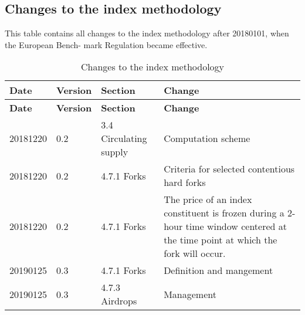 \documentclass{article}
\begin{document}
\subsection{Changes to the index
methodology}\label{changes-to-the-index-methodology}

This table contains all changes to the index methodology after 20180101,
when the European Bench- mark Regulation became effective.

\begin{longtable}[]{@{}llll@{}}
\caption{Changes to the index methodology{}}\tabularnewline
\toprule
\textbf{Date} & \textbf{Version} & \textbf{Section} &
\textbf{Change}\tabularnewline
\midrule
\endfirsthead
\toprule
\textbf{Date} & \textbf{Version} & \textbf{Section} &
\textbf{Change}\tabularnewline
\midrule
\endhead
20181220 & 0.2 & 3.4 Circulating supply & Computation
scheme\tabularnewline
20181220 & 0.2 & 4.7.1 Forks & Criteria for selected contentious hard
forks\tabularnewline
20181220 & 0.2 & 4.7.1 Forks &
\multicolumn{1}{p{6cm}}{The price of an index constituent is frozen during a 2-hour time window centered at the time point at which the fork will occur.}\tabularnewline
20190125 & 0.3 & 4.7.1 Forks & Definition and mangement\tabularnewline
20190125 & 0.3 & 4.7.3 Airdrops & Management\tabularnewline
\bottomrule
\end{longtable}
\end{document}
